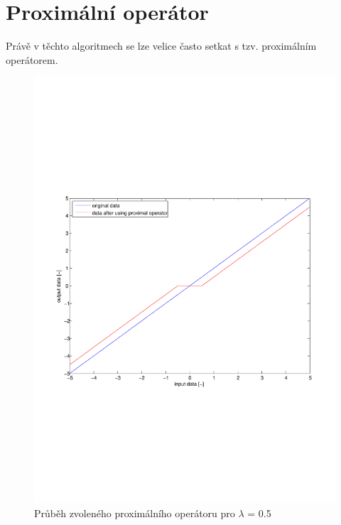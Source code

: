 \documentclass[FM,BP]{tulthesis}
\begin{document}
\section{Proximální operátor}
Právě v těchto algoritmech se lze velice často setkat s tzv. proximálním operátorem.

\begin{figure}[!h]
\begin{center}
\includegraphics[scale=0.55]{obr/threshhold.pdf}
\end{center}
\caption{Průběh zvoleného proximálního operátoru pro $\lambda$ = 0.5}
\label{fig:threshhold}
\end{figure}
\end{document}
